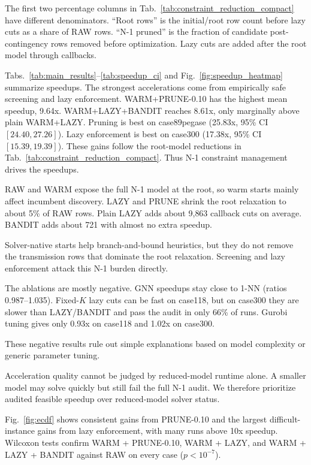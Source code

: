 \documentclass[runningheads]{llncs}
\begin{document}
The first two percentage columns in Tab.~\ref{tab:constraint_reduction_compact} have different denominators. ``Root rows'' is the initial/root row count before lazy cuts as a share of RAW rows. ``N-1 pruned'' is the fraction of candidate post-contingency rows removed before optimization. Lazy cuts are added after the root model through callbacks.

Tabs.~\ref{tab:main_results}--\ref{tab:speedup_ci} and Fig.~\ref{fig:speedup_heatmap} summarize speedups. The strongest accelerations come from empirically safe screening and lazy enforcement. WARM+PRUNE-0.10 has the highest mean speedup, 9.64x. WARM+LAZY+BANDIT reaches 8.61x, only marginally above plain WARM+LAZY. Pruning is best on case89pegase (25.83x, 95\% CI $[24.40, 27.26]$). Lazy enforcement is best on case300 (17.38x, 95\% CI $[15.39, 19.39]$). These gains follow the root-model reductions in Tab.~\ref{tab:constraint_reduction_compact}. Thus N-1 constraint management drives the speedups.

RAW and WARM expose the full N-1 model at the root, so warm starts mainly affect incumbent discovery. LAZY and PRUNE shrink the root relaxation to about 5\% of RAW rows. Plain LAZY adds about 9{,}863 callback cuts on average. BANDIT adds about 721 with almost no extra speedup.

Solver-native starts help branch-and-bound heuristics, but they do not remove the transmission rows that dominate the root relaxation. Screening and lazy enforcement attack this N-1 burden directly.

The ablations are mostly negative. GNN speedups stay close to 1-NN (ratios 0.987--1.035). Fixed-$K$ lazy cuts can be fast on case118, but on case300 they are slower than LAZY/BANDIT and pass the audit in only 66\% of runs. Gurobi tuning gives only 0.93x on case118 and 1.02x on case300.

These negative results rule out simple explanations based on model complexity or generic parameter tuning.

Acceleration quality cannot be judged by reduced-model runtime alone. A smaller model may solve quickly but still fail the full N-1 audit. We therefore prioritize audited feasible speedup over reduced-model solver status.

Fig.~\ref{fig:ecdf} shows consistent gains from PRUNE-0.10 and the largest difficult-instance gains from lazy enforcement, with many runs above 10x speedup. Wilcoxon tests confirm WARM + PRUNE-0.10, WARM + LAZY, and WARM + LAZY + BANDIT against RAW on every case ($p<10^{-7}$).
\end{document}

